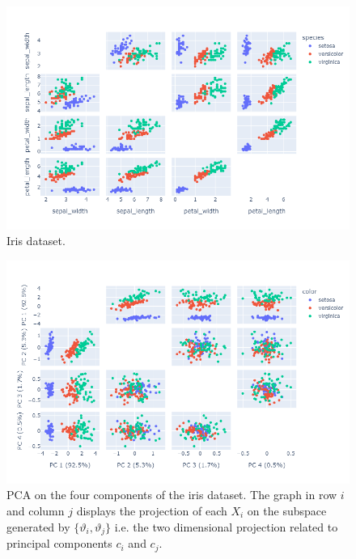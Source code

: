 \begin{figure}
        \centering
            \includegraphics[width=.9\textwidth]{./Illustrations/pca_iris}
        \caption{\small Iris dataset.} 
        \label{fig:pca:iris}
    \end{figure}

\begin{figure}
        \centering
            \includegraphics[width=.9\textwidth]{./Illustrations/pca_iris_proj}
        \caption{\small PCA on the four components of the iris dataset. The graph in row $i$ and column $j$ displays the projection of each $X_i$ on the subspace generated by $\{\vartheta_i,\vartheta_j\}$ i.e. the two dimensional projection related to principal components $c_i$ and $c_j$.} 
        \label{fig:pca:iris:proj}
    \end{figure}

